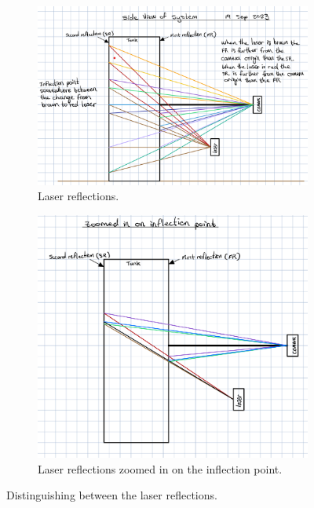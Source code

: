 \begin{figure}[h]
    \centering
    \begin{subfigure}[t]{0.45\textwidth}
        \includegraphics[width=\linewidth]{figures/distinguish_lasers.png}
        \caption{Laser reflections.}
    \end{subfigure}
    \quad
    \begin{subfigure}[t]{0.45\textwidth}
        \includegraphics[width=\linewidth]{figures/distinguish_lasers_zoomed_inflection.png}
        \caption{Laser reflections zoomed in on the inflection point.}
    \end{subfigure}
    \caption{Distinguishing between the laser reflections.}
    \label{fig:distinguish_lasers}
\end{figure}



